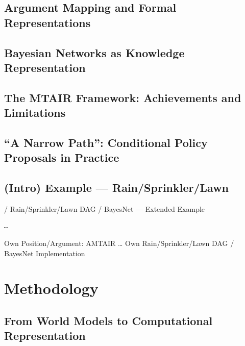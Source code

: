 \documentclass[
  letterpaper,
]{book}
\begin{document}
\subsection{\texorpdfstring{\textbf{Argument Mapping and Formal
Representations}}{Argument Mapping and Formal Representations}}\label{argument-mapping-and-formal-representations}

\subsection{\texorpdfstring{\textbf{Bayesian Networks as Knowledge
Representation}}{Bayesian Networks as Knowledge Representation}}\label{bayesian-networks-as-knowledge-representation}

\subsection{\texorpdfstring{\textbf{The MTAIR Framework: Achievements
and
Limitations}}{The MTAIR Framework: Achievements and Limitations}}\label{the-mtair-framework-achievements-and-limitations}

\subsection{\texorpdfstring{\textbf{``A Narrow Path'': Conditional
Policy Proposals in
Practice}}{``A Narrow Path'': Conditional Policy Proposals in Practice}}\label{a-narrow-path-conditional-policy-proposals-in-practice}

\subsection{(Intro) Example ---
Rain/Sprinkler/Lawn}\label{intro-example-rainsprinklerlawn}

/ Rain/Sprinkler/Lawn DAG / BayesNet --- Extended Example

\begin{verbatim}
…
\end{verbatim}

Own Position/Argument: AMTAIR \ldots{} Own Rain/Sprinkler/Lawn DAG /
BayesNet Implementation

\section{Methodology}\label{methodology}

\subsection{From World Models to Computational
Representation}\label{from-world-models-to-computational-representation}
\end{document}
